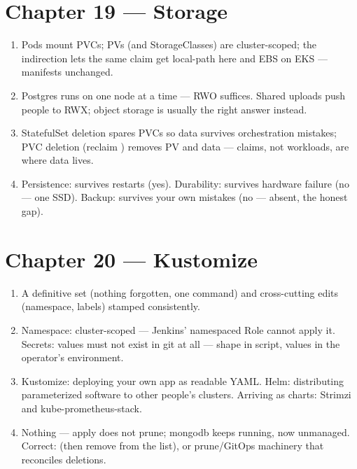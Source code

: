 \section*{Chapter 19 --- Storage}
\begin{enumerate}
  \item Pods mount PVCs; PVs (and StorageClasses) are cluster-scoped;
  the indirection lets the same claim get local-path here and EBS on
  EKS --- manifests unchanged.
  \item Postgres runs on one node at a time --- RWO suffices. Shared
  uploads push people to RWX; object storage is usually the right
  answer instead.
  \item StatefulSet deletion spares PVCs so data survives
  orchestration mistakes; PVC deletion (reclaim )
  removes PV and data --- claims, not workloads, are where data
  lives.
  \item Persistence: survives restarts (yes). Durability: survives
  hardware failure (no --- one SSD). Backup: survives your own
  mistakes (no --- absent, the honest gap).
\end{enumerate}

\section*{Chapter 20 --- Kustomize}
\begin{enumerate}
  \item A definitive set (nothing forgotten, one command) and
  cross-cutting edits (namespace, labels) stamped consistently.
  \item Namespace: cluster-scoped --- Jenkins' namespaced Role cannot
  apply it. Secrets: values must not exist in git at all --- shape in
  script, values in the operator's environment.
  \item Kustomize: deploying your own app as readable YAML. Helm:
  distributing parameterized software to other people's clusters.
  Arriving as charts: Strimzi and kube-prometheus-stack.
  \item Nothing --- apply does not prune; mongodb keeps running,
  now unmanaged. Correct: 
  (then remove from the list), or prune/GitOps machinery that
  reconciles deletions.
\end{enumerate}

